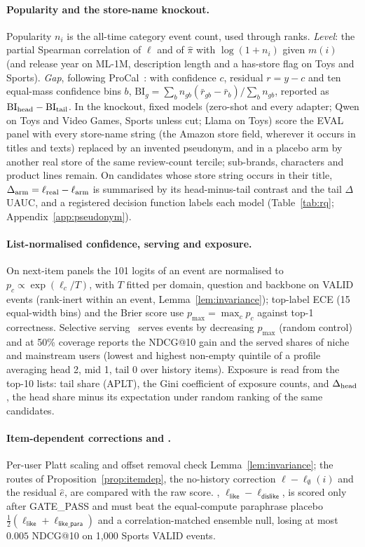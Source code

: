 \paragraph{Popularity and the store-name knockout.}
Popularity $n_i$ is the all-time category event count, used through ranks. \emph{Level}: the partial Spearman correlation of $\ell$
and of $\hat\pi$ with $\log(1+n_i)$ given $m(i)$ (and release year on ML-1M, description length and a has-store flag on Toys and
Sports). \emph{Gap}, following ProCal~\citep{xiong2023procal}: with confidence $c$, residual $r=y-c$ and ten equal-mass confidence bins
$b$, $\mathrm{BI}_g=\sum_b n_{gb}(\bar r_{gb}-\bar r_b)/\sum_b n_{gb}$, reported as $\mathrm{BI}_{\rm head}-\mathrm{BI}_{\rm tail}$. In
the knockout, fixed models (zero-shot and every adapter; Qwen on Toys and Video Games, Sports unless cut; Llama on Toys) score the EVAL
panel with every store-name string (the Amazon store field, wherever it occurs in titles and texts) replaced by an invented pseudonym,
and in a placebo arm by another real store of the same review-count tercile; sub-brands, characters and product lines remain. On
candidates whose store string occurs in their title, $\Delta_{\rm arm}=\ell_{\rm real}-\ell_{\rm arm}$ is summarised by its
head-minus-tail contrast and the tail $\Delta$UAUC, and a registered decision function labels each model (Table~\ref{tab:rq};
Appendix~\ref{app:pseudonym}).

\paragraph{List-normalised confidence, serving and exposure.}
On next-item panels the 101 logits of an event are normalised to $p_c\propto\exp(\ell_c/T)$, with $T$ fitted per domain, question and
backbone on VALID events (rank-inert within an event, Lemma~\ref{lem:invariance}); top-label ECE (15 equal-width bins) and the Brier
score use $p_{\max}=\max_c p_c$ against top-1 correctness. Selective serving~\citep{geifman2017selective} serves events by decreasing
$p_{\max}$ (random control) and at 50\% coverage reports the NDCG@10 gain and the served shares of niche and mainstream users (lowest
and highest non-empty quintile of a profile averaging head 2, mid 1, tail 0 over history items). Exposure is read from the top-10
lists: tail share (APLT), the Gini coefficient of exposure counts, and $\Delta_{\rm head}$, the head share minus its expectation under
random ranking of the same candidates.

\paragraph{Item-dependent corrections and \method{}.}
Per-user Platt scaling and offset removal check Lemma~\ref{lem:invariance}; the routes of Proposition~\ref{prop:itemdep}, the
no-history correction $\ell-\ell_\emptyset(i)$ and the residual $\hat e$, are compared with the raw score. \method{},
$\ell_{\textsf{like}}-\ell_{\textsf{dislike}}$, is scored only after GATE\_PASS and must beat the equal-compute paraphrase placebo
$\tfrac12(\ell_{\textsf{like}}+\ell_{\textsf{like\_para}})$ and a correlation-matched ensemble null, losing at most $0.005$ NDCG@10 on
1,000 Sports VALID events.

